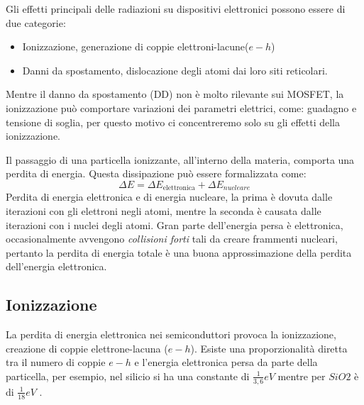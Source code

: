 
Gli effetti principali delle radiazioni su dispositivi elettronici possono essere di due categorie\cite{bib:Effetti_Radiazioni_1987}:
\begin{itemize}
	\item Ionizzazione, generazione di coppie elettroni-lacune($e-h$)
	\item Danni da spostamento, dislocazione degli atomi dai loro siti reticolari.
\end{itemize}
Mentre il danno da spostamento (DD) non è molto rilevante sui MOSFET, la ionizzazione può comportare variazioni dei parametri elettrici, come: guadagno e tensione di soglia, per questo motivo ci concentreremo solo su gli effetti della ionizzazione.

\vspace{0.5cm}

Il passaggio di una particella ionizzante, all'interno della materia, comporta una perdita di energia. Questa dissipazione può essere formalizzata come:
$$ \Delta E = \Delta E_{\text{elettronica}} + \Delta E_{nucleare} $$
Perdita di energia elettronica e di energia nucleare, la prima è dovuta dalle iterazioni con gli elettroni negli atomi, mentre la seconda è causata dalle iterazioni con i nuclei degli atomi.
Gran parte dell'energia persa è elettronica, occasionalmente avvengono \textit{collisioni forti} tali da creare frammenti nucleari, pertanto la perdita di energia totale è una buona approssimazione della perdita dell'energia elettronica\cite{bib:Effetti_Radiazioni_NASA}.

\vspace{0.5cm}

\subsection{Ionizzazione}
La perdita di energia elettronica nei semiconduttori provoca la ionizzazione, creazione di coppie elettrone-lacuna ($e-h$). Esiste una proporzionalità diretta tra il numero di coppie $e-h$ e l'energia elettronica persa da parte della particella, per esempio, nel silicio si ha una constante di $\frac{1}{3,6}eV$ mentre per $SiO2$ è di $\frac{1}{18}eV$ \cite{bib:Effetti_Radiazioni_NASA}.

\vspace{0.5cm}

